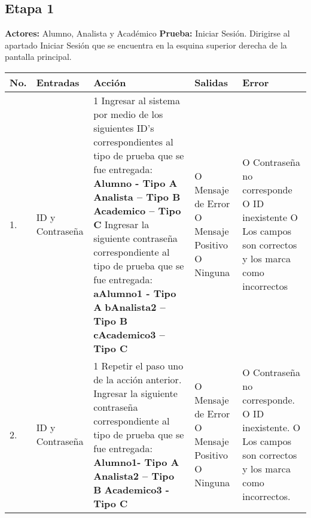 \subsection*{Etapa 1}
\textbf{Actores:} Alumno, Analista y Académico\newline
\textbf{Prueba:} Iniciar Sesión.
Dirigirse al apartado Iniciar Sesión que se encuentra en la esquina superior derecha de la pantalla principal.
\begin{longtable}{|p{0.7cm}|p{3cm}|p{6cm}|p{2.3cm}|p{3cm}|}
    \hline	
	\textbf{No.}
	&
	\textbf{Entradas}	
	&
	\textbf{Acción}
	&
	\textbf{Salidas}
	&
	\textbf{Error}
	\\
	\hline
	1.
	&
	ID y Contraseña
	&
	1 Ingresar al sistema por medio de los siguientes ID’s correspondientes al tipo de prueba que se fue entregada:\newline
	\textbf{Alumno - Tipo A}\newline
	\textbf{Analista – Tipo B}\newline 
	\textbf{Academico – Tipo C}\newline
	2 Ingresar la siguiente contraseña correspondiente al tipo de prueba que se fue entregada:\newline
	\textbf{aAlumno1 - Tipo A}\newline
	\textbf{bAnalista2 – Tipo B}\newline
	\textbf{cAcademico3 – Tipo C}\newline
	& 	
	O Mensaje de Error\newline
	O Mensaje Positivo\newline
	O Ninguna
	&
	O Contraseña no corresponde\newline
	O ID inexistente\newline
	O Los campos son correctos y los marca como incorrectos\\
	\hline
	2. 
	&
	ID y Contraseña
	&
	1 Repetir el paso uno de la acción anterior.\newline
	2 Ingresar la siguiente contraseña correspondiente al tipo de prueba que se fue entregada:\newline
	\textbf{Alumno1- Tipo A}\newline
	\textbf{Analista2 – Tipo B}\newline
	\textbf{Academico3 -  Tipo C}\newline
	& 	
	O Mensaje de Error\newline
	O Mensaje Positivo\newline
	O Ninguna
	&
	O Contraseña no corresponde.\newline
	O ID inexistente.\newline
	O Los campos son correctos y los marca como incorrectos.\\
	\hline
\end{longtable}
\newpage
